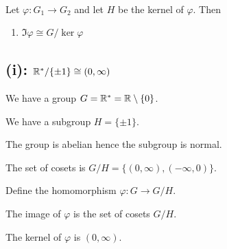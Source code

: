 \documentclass[12pt]{article}
\begin{document}
\begin{theorem*}~\\
  Let $\varphi:G_1 \to G_2$ and let $H$ be the kernel of $\varphi$. Then
  \begin{enumerate}
  \item $\Im \varphi \cong G/ \ker \varphi$
  \end{enumerate}
\end{theorem*}

\subsection*{(i): $\mathbb{R}^*/\{\pm 1\} \cong (0, \infty)$}

We have a group $G = \mathbb{R}^* = \mathbb{R}\setminus\{0\}$.

We have a subgroup $H = \{\pm 1\}$.

The group is abelian hence the subgroup is normal.

The set of cosets is $G/H = \{(0, \infty), (-\infty, 0)\}$.

Define the homomorphism $\varphi: G \to G/H$.

The image of $\varphi$ is the set of cosets $G/H$.

The kernel of $\varphi$ is $(0, \infty)$.
\end{document}
